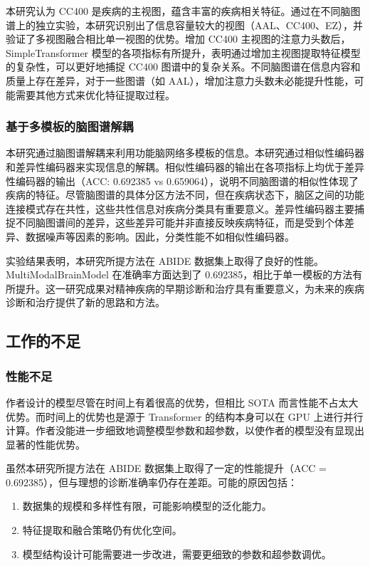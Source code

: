 \documentclass[12pt,a4paper]{article}
\begin{document}
本研究认为 CC400 是疾病的主视图，蕴含丰富的疾病相关特征。通过在不同脑图谱上的独立实验，本研究识别出了信息容量较大的视图（AAL、CC400、EZ），并验证了多视图融合相比单一视图的优势。增加 CC400 主视图的注意力头数后，SimpleTransformer 模型的各项指标有所提升，表明通过增加主视图提取特征模型的复杂性，可以更好地捕捉 CC400 图谱中的复杂关系。不同脑图谱在信息内容和质量上存在差异，对于一些图谱（如 AAL），增加注意力头数未必能提升性能，可能需要其他方式来优化特征提取过程。

\subsubsection{基于多模板的脑图谱解耦}

本研究通过脑图谱解耦来利用功能脑网络多模板的信息。本研究通过相似性编码器和差异性编码器来实现信息的解耦。相似性编码器的输出在各项指标上均优于差异性编码器的输出（ACC: 0.692385 vs 0.659064），说明不同脑图谱的相似性体现了疾病的特征。尽管脑图谱的具体分区方法不同，但在疾病状态下，脑区之间的功能连接模式存在共性，这些共性信息对疾病分类具有重要意义。差异性编码器主要捕捉不同脑图谱间的差异，这些差异可能并非直接反映疾病特征，而是受到个体差异、数据噪声等因素的影响。因此，分类性能不如相似性编码器。

实验结果表明，本研究所提方法在 ABIDE 数据集上取得了良好的性能。MultiModalBrainModel 在准确率方面达到了 0.692385，相比于单一模板的方法有所提升。这一研究成果对精神疾病的早期诊断和治疗具有重要意义，为未来的疾病诊断和治疗提供了新的思路和方法。

\subsection{工作的不足}

\subsubsection{性能不足}

作者设计的模型尽管在时间上有着很高的优势，但相比 SOTA 而言性能不占太大优势。而时间上的优势也是源于 Transformer 的结构本身可以在 GPU 上进行并行计算。作者没能进一步细致地调整模型参数和超参数，以使作者的模型没有显现出显著的性能优势。

虽然本研究所提方法在 ABIDE 数据集上取得了一定的性能提升（ACC = 0.692385），但与理想的诊断准确率仍存在差距。可能的原因包括：

\begin{enumerate}
\item 数据集的规模和多样性有限，可能影响模型的泛化能力。
\item 特征提取和融合策略仍有优化空间。
\item 模型结构设计可能需要进一步改进，需要更细致的参数和超参数调优。
\end{enumerate}
\end{document}
